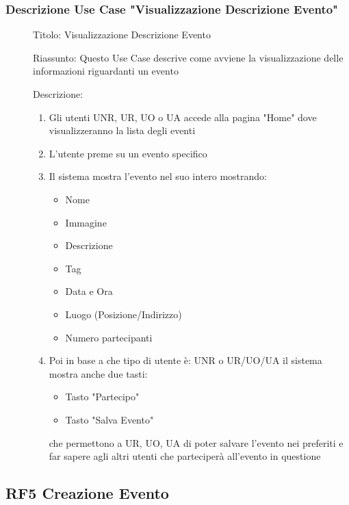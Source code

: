 \documentclass{article}
\begin{document}
\subsubsection*{Descrizione Use Case "Visualizzazione Descrizione Evento"}
\begin{description}
    \item[] Titolo: Visualizzazione Descrizione Evento
    \item[] Riassunto: Questo Use Case descrive come avviene la visualizzazione delle informazioni riguardanti un evento
    \item[] Descrizione:
        \begin{enumerate}
            \item Gli utenti UNR, UR, UO o UA accede alla pagina "Home" dove visualizzeranno la lista degli eventi
            \item L'utente preme su un evento specifico
            \item Il sistema mostra l'evento nel suo intero mostrando:
                  \begin{itemize}
                      \item Nome
                      \item Immagine
                      \item Descrizione
                      \item Tag
                      \item Data e Ora
                      \item Luogo (Posizione/Indirizzo)
                      \item Numero partecipanti
                  \end{itemize}
            \item Poi in base a che tipo di utente è: UNR o UR/UO/UA il sistema mostra anche due tasti:
                  \begin{itemize}
                      \item Tasto "Partecipo"
                      \item Tasto "Salva Evento"
                  \end{itemize}
                  che permettono a UR, UO, UA di poter salvare l'evento nei preferiti e far sapere agli altri utenti che parteciperà all'evento in questione
        \end{enumerate}
\end{description}
\clearpage
\subsection{RF5 Creazione Evento}
\end{document}
